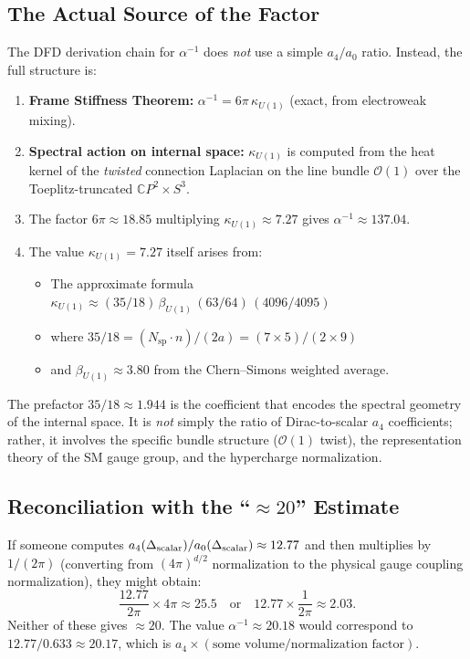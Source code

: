\documentclass[12pt,a4paper]{article}
\theoremstyle{definition}
\begin{document}
\subsection{The Actual Source of the Factor}

The DFD derivation chain for $\alpha^{-1}$ does \emph{not} use a
simple $a_4/a_0$ ratio.  Instead, the full structure is:

\begin{enumerate}
\item \textbf{Frame Stiffness Theorem:} $\alpha^{-1} = 6\pi\,
  \kappa_{U(1)}$ (exact, from electroweak mixing).

\item \textbf{Spectral action on internal space:} $\kappa_{U(1)}$
  is computed from the heat kernel of the \emph{twisted} connection
  Laplacian on the line bundle $\mathcal{O}(1)$ over the
  Toeplitz-truncated $\mathbb{C}P^2 \times S^3$.

\item The factor $6\pi \approx 18.85$ multiplying $\kappa_{U(1)}
  \approx 7.27$ gives $\alpha^{-1} \approx 137.04$.

\item The value $\kappa_{U(1)} = 7.27$ itself arises from:
  \begin{itemize}
  \item The approximate formula $\kappa_{U(1)} \approx (35/18)\,
    \beta_{U(1)}\,(63/64)\,(4096/4095)$
  \item where $35/18 = (N_{\text{sp}} \cdot n)/(2a) = (7 \times
    5)/(2 \times 9)$
  \item and $\beta_{U(1)} \approx 3.80$ from the Chern--Simons
    weighted average.
  \end{itemize}
\end{enumerate}

The prefactor $35/18 \approx 1.944$ is the coefficient that encodes
the spectral geometry of the internal space.  It is \emph{not}
simply the ratio of Dirac-to-scalar $a_4$ coefficients; rather, it
involves the specific bundle structure ($\mathcal{O}(1)$ twist),
the representation theory of the SM gauge group, and the hypercharge
normalization.


\subsection{Reconciliation with the ``$\approx 20$'' Estimate}

If someone computes $a_4(\Delta_{\text{scalar}})/a_0(\Delta_%
{\text{scalar}}) \approx 12.77$ and then multiplies by $1/(2\pi)$
(converting from $(4\pi)^{d/2}$ normalization to the physical gauge
coupling normalization), they might obtain:
\begin{equation}
\frac{12.77}{2\pi} \times 4\pi \approx 25.5
  \quad\text{or}\quad
12.77 \times \frac{1}{2\pi} \approx 2.03.
\end{equation}
Neither of these gives $\approx 20$.  The value $\alpha^{-1} \approx
20.18$ would correspond to $12.77 / 0.633 \approx 20.17$, which is
$a_4 \times (\text{some volume/normalization factor})$.
\end{document}
